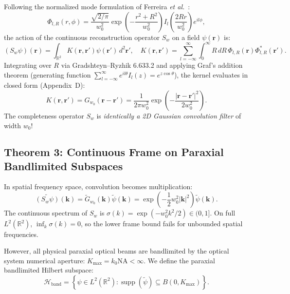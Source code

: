 \documentclass[11pt,a4paper]{article}
\begin{document}
Following the normalized mode formulation of Ferreira \emph{et al.}~\cite{Ferreira2026}:
\begin{equation}
\Phi_{l, R}(r, \phi) = \frac{\sqrt{2/\pi}}{w_0^2} \exp\left( - \frac{r^2 + R^2}{w_0^2} \right) I_l\left( \frac{2 R r}{w_0^2} \right) e^{i l \phi},
\end{equation}
the action of the continuous reconstruction operator $S_w$ on a field $\psi(\mathbf{r})$ is:
\begin{equation}
(S_w \psi)(\mathbf{r}) = \int_{\mathbb{R}^2} K(\mathbf{r}, \mathbf{r}') \psi(\mathbf{r}') \, d^2\mathbf{r}', \quad K(\mathbf{r}, \mathbf{r}') = \sum_{l=-\infty}^\infty \int_0^\infty R \, dR \, \Phi_{l, R}(\mathbf{r}) \Phi_{l, R}^*(\mathbf{r}').
\end{equation}
Integrating over $R$ via Gradshteyn--Ryzhik 6.633.2 and applying Graf's addition theorem (generating function $\sum_{l=-\infty}^\infty e^{i l \theta} I_l(z) = e^{z \cos \theta}$), the kernel evaluates in closed form (Appendix~D):
\begin{equation}
\boxed{K(\mathbf{r}, \mathbf{r}') = G_{w_0}(\mathbf{r} - \mathbf{r}') = \frac{1}{2\pi w_0^2} \exp\left( - \frac{|\mathbf{r} - \mathbf{r}'|^2}{2 w_0^2} \right).}
\label{eq:gaussian_kernel}
\end{equation}
The completeness operator $S_w$ is \emph{identically a 2D Gaussian convolution filter} of width $w_0$!

\subsection{Theorem 3: Continuous Frame on Paraxial Bandlimited Subspaces}

In spatial frequency space, convolution becomes multiplication:
\begin{equation}
\widetilde{(S_w \psi)}(\mathbf{k}) = \widetilde{G}_{w_0}(\mathbf{k}) \widetilde{\psi}(\mathbf{k}) = \exp\left( - \frac{1}{2} w_0^2 |\mathbf{k}|^2 \right) \widetilde{\psi}(\mathbf{k}).
\end{equation}
The continuous spectrum of $S_w$ is $\sigma(k) = \exp(-w_0^2 k^2 / 2) \in (0, 1]$. On full $L^2(\mathbb{R}^2)$, $\inf_{k} \sigma(k) = 0$, so the lower frame bound fails for unbounded spatial frequencies.

However, all physical paraxial optical beams are bandlimited by the optical system numerical aperture: $K_{\max} = k_0 \text{NA} < \infty$. We define the paraxial bandlimited Hilbert subspace:
\begin{equation}
\mathcal{H}_{\text{band}} = \left\{ \psi \in L^2(\mathbb{R}^2) : \operatorname{supp}(\widetilde{\psi}) \subseteq B(0, K_{\max}) \right\}.
\end{equation}
\end{document}
